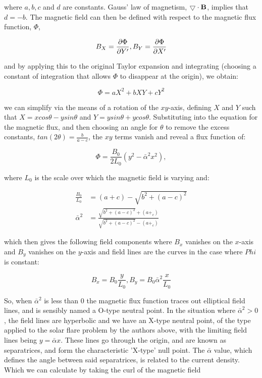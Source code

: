 \noindent where $a, b, c$ and $d$ are constants.
Gauss' law of magnetism, $\bigtriangledown \cdot \mathbf{B}$, implies that $d = -b$.
The magnetic field can then be defined with respect to the magnetic flux function, $\Phi$,

\begin{equation}
	B_X = \frac{\partial \Phi}{\partial Y' }, B_Y = \frac{\partial \Phi}{\partial X' }
\end{equation}  

\noindent and by applying this to the original Taylor expansion and integrating (choosing a constant of integration that allows $\Phi$ to disappear at the origin), we obtain:

\begin{equation}
	\Phi = aX^2 + bXY + cY^2
\end{equation}

\noindent we can simplify via the means of a rotation of the $xy$-axis, defining $X$ and $Y$ such that $X = xcos\theta - y sin\theta$ and $ Y = y sin\theta + y cos\theta$.
Substituting into the equation for the magnetic flux, and then choosing an angle for $\theta$ to remove the excess constants, $tan(2\theta) = \frac{b}{a - c}$, the $xy$ terms vanish and reveal a flux function of:

\begin{equation}
	\Phi = \frac{B_0}{2L_0}(y^2 - \bar{\alpha}^2x^2),
\end{equation}

\noindent where $L_0$ is the scale over which the magnetic field is varying and: 

\begin{align}
	\frac{B_0}{L_0} &= (a + c) - \sqrt{b^2 + (a - c)^2}\\
	\bar{\alpha}^2 &= \frac{\sqrt{b^2 + (a - c)^2} + (a +_c)}{\sqrt{b^2 + (a - c)^2} - (a +_c)}
\end{align}

\noindent which then gives the following field components where $B_x$ vanishes on the $x$-axis and $B_y$ vanishes on the $y$-axis and field lines are the curves in the case where $Phi$ is constant:

\begin{equation}
	B_x = B_0\frac{y}{L_0}, B_y = B_0\bar{\alpha}^2\frac{x}{L_0}
\end{equation}

\noindent So, when $\bar{\alpha}^2$ is less than $0$ the magnetic flux function traces out elliptical field lines, and is sensibly named a O-type neutral point.
In the situation where $\bar{\alpha}^2 > 0$, the field lines are hyperbolic and we have an X-type neutral point, of the type applied to the solar flare problem by the authors above, with the limiting field lines being $y = \bar{\alpha}x$.
These lines go through the origin, and are known as separatrices, and form the characteristic 'X-type' null point. 
The $\bar{\alpha}$ value, which defines the angle between said separatrices, is related to the current density.
Which we can calculate by taking the curl of the magnetic field

